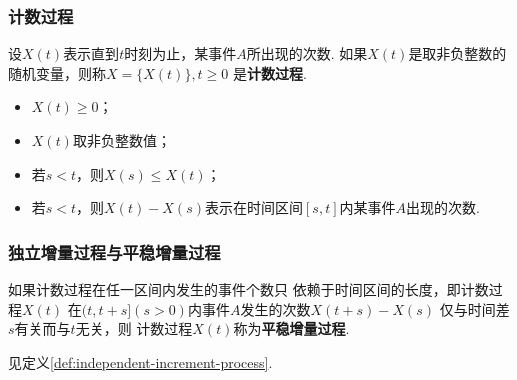 \setcounter{footnote}{0}

\begin{frame}
    \frametitle{计数过程}
    \begin{mydefinition}[计数过程]
        设$X(t)$表示直到$t$时刻为止，某事件$A$所出现的次数. 
        如果$X(t)$是取非负整数的随机变量，则称$X=\{X(t)\},t\geqslant 0$
        是\textbf{计数过程}. 
    \end{mydefinition}
    \begin{myproposition}
        \begin{itemize}
            \item $X(t)\geqslant0$；
            \item $X(t)$取非负整数值；
            \item 若$s<t$，则$X(s)\leqslant X(t)$；
            \item 若$s<t$，则$X(t)-X(s)$表示在时间区间$[s,t]$内某事件$A$出现的次数. 
        \end{itemize}
    \end{myproposition}
\end{frame}

\setcounter{footnote}{0}

\begin{frame}
    \frametitle{独立增量过程与平稳增量过程}
    \begin{mydefinition}[平稳增量过程]
        如果计数过程在任一区间内发生的事件个数只
        依赖于时间区间的长度，即计数过程$X(t)$
        在$(t,t+s](s>0)$内事件$A$发生的次数$X(t+s)-X(s)$
        仅与时间差$s$有关而与$t$无关，则
        计数过程$X(t)$称为\textbf{平稳增量过程}. 
    \end{mydefinition}
    \begin{mydefinition}[独立增量过程]
        见定义\ref{def:independent-increment-process}.
    \end{mydefinition}
\end{frame}

